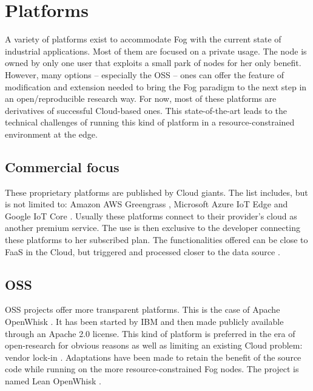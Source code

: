 \documentclass[11pt]{sdm}
\begin{document}
\section{Platforms}
\label{sec:platforms}

A variety of platforms exist to accommodate Fog with the current state of industrial applications. Most of them are focused on a private usage. The node is owned by only one user that exploits a small park of nodes for her only benefit. However, many options -- especially the \gls{OSS} -- ones can offer the feature of modification and extension needed to bring the Fog paradigm to the next step in an open/reproducible research way. For now, most of these platforms are derivatives of successful Cloud-based ones. This state-of-the-art leads to the technical challenges of running this kind of platform in a resource-constrained environment at the edge.

\subsection{Commercial focus}

These proprietary platforms are published by Cloud giants. The list includes, but is not limited to: Amazon AWS Greengrass \cite{noauthor_aws_nodate}, Microsoft Azure IoT Edge \cite{noauthor_iot_nodate} and Google IoT Core \cite{noauthor_cloud_nodate}. Usually these platforms connect to their provider's cloud as another premium service. The use is then exclusive to the developer connecting these platforms to her subscribed plan. The functionalities offered can be close to \gls{FaaS} in the Cloud, but triggered and processed closer to the data source \cite{elgamal_costless_2018}.

\hypersetup{linkcolor=}
\subsection{\acrfull{OSS}}
\gls{OSS} projects offer more transparent platforms. This is the case of Apache OpenWhisk \cite{noauthor_apache_nodate}. It has been started by IBM and then made publicly available through an Apache 2.0 license. This kind of platform is preferred in the era of open-research for obvious reasons as well as limiting an existing Cloud problem: vendor lock-in \cite{kjorveziroski_iot_2021}. Adaptations have been made to retain the benefit of the source code while running on the more resource-constrained Fog nodes. The project is named Lean OpenWhisk \cite{breitgand_lean_2018}.
\end{document}
